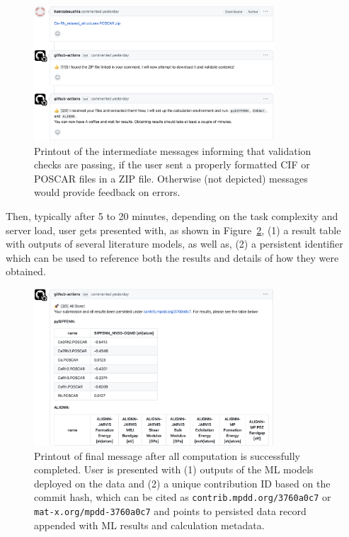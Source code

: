 \begin{figure}[H]
    \centering
    \includegraphics[width=0.8\textwidth]{mpdd/mpddx2.png}
    \caption{Printout of the intermediate messages informing that validation checks are passing, if the user sent a properly formatted CIF or POSCAR files in a ZIP file. Otherwise (not depicted) messages would provide feedback on errors.}
    \label{mpdd:fig:mpddx2}
\end{figure}

Then, typically after 5 to 20 minutes, depending on the task complexity and server load, user gets presented with, as shown in Figure~\ref{mpdd:fig:mpddx3}, (1) a result table with outputs of several literature models, as well as, (2) a persistent identifier which can be used to reference both the results and details of how they were obtained.

\begin{figure}[H]
    \centering
    \includegraphics[width=0.8\textwidth]{mpdd/mpddx3.png}
    \caption{Printout of final message after all computation is successfully completed. User is presented with (1) outputs of the ML models deployed on the data and (2) a unique contribution ID based on the commit hash, which can be cited as \texttt{contrib.mpdd.org/3760a0c7} or \texttt{mat-x.org/mpdd-3760a0c7} and points to persisted data record appended with ML results and calculation metadata.}
    \label{mpdd:fig:mpddx3}
\end{figure}

